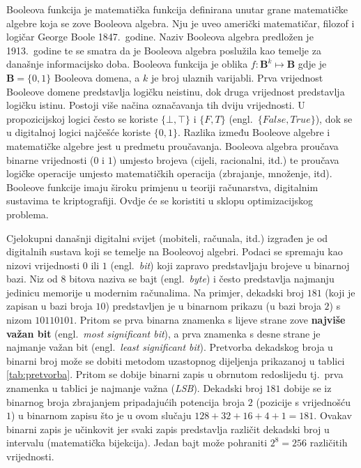 \documentclass[times, utf8, diplomski]{fer}
\begin{document}
Booleova funkcija je matematička funkcija definirana unutar grane matematičke algebre koja se zove Booleova algebra. Nju je uveo američki matematičar, filozof i logičar George Boole 1847.~godine. Naziv Booleova algebra predložen je 1913.~godine te se smatra da je Booleova algebra poslužila kao temelje za današnje informacijsko doba. Booleova funkcija je oblika $f:\boldsymbol{B}^{k}\mapsto \boldsymbol{B}$ gdje je $\boldsymbol{B}=\{0, 1\}$ Booleova domena, a $k$ je broj ulaznih varijabli. Prva vrijednost Booleove domene predstavlja logičku neistinu, dok druga vrijednost predstavlja logičku istinu. Postoji više načina označavanja tih dviju vrijednosti. U propozicijskoj logici često se koriste $\{\bot, \top \}$ i $\{F, T\}$ (engl.~\textit{$\{False, True\}$}), dok se u digitalnoj logici najčešće koriste $\{0, 1\}$. Razlika između Booleove algebre i matematičke algebre jest u predmetu proučavanja. Booleova algebra proučava binarne vrijednosti ($0$ i $1$) umjesto brojeva (cijeli, racionalni, itd.) te proučava logičke operacije umjesto matematičkih operacija (zbrajanje, množenje, itd). Booleove funkcije imaju široku primjenu u teoriji računarstva, digitalnim sustavima te kriptografiji. Ovdje će se koristiti u sklopu optimizacijskog problema.

Cjelokupni današnji digitalni svijet (mobiteli, računala, itd.) izgrađen je od digitalnih sustava koji se temelje na Booleovoj algebri. Podaci se spremaju kao nizovi vrijednosti $0$ ili $1$ (engl.~\textit{bit}) koji zapravo predstavljaju brojeve u binarnoj bazi. Niz od $8$ bitova naziva se bajt (engl.~\textit{byte}) i često predstavlja najmanju jedinicu memorije u modernim računalima. Na primjer, dekadski broj $181$ (koji je zapisan u bazi broja $10$) predstavljen je u binarnom prikazu (u bazi broja $2$) s nizom $10110101$. Pritom se prva binarna znamenka s lijeve strane zove \textbf{najviše važan bit} (engl.~\textit{most significant bit}), a prva znamenka s desne strane je najmanje važan bit (engl.~\textit{least significant bit}). Pretvorba dekadskog broja u binarni broj može se dobiti metodom uzastopnog dijeljenja prikazanoj u tablici \ref{tab:pretvorba}. Pritom se dobije binarni zapis u obrnutom redoslijedu tj.~prva znamenka u tablici je najmanje važna (\textit{LSB}). Dekadski broj $181$ dobije se iz binarnog broja zbrajanjem pripadajućih potencija broja $2$ (pozicije s vrijednošću $1$) u binarnom zapisu što je u ovom slučaju $128+32+16+4+1=181$. Ovakav binarni zapis je učinkovit jer svaki zapis predstavlja različit dekadski broj u intervalu (matematička bijekcija). Jedan bajt može pohraniti $2^{8}=256$ različitih vrijednosti.
\end{document}
